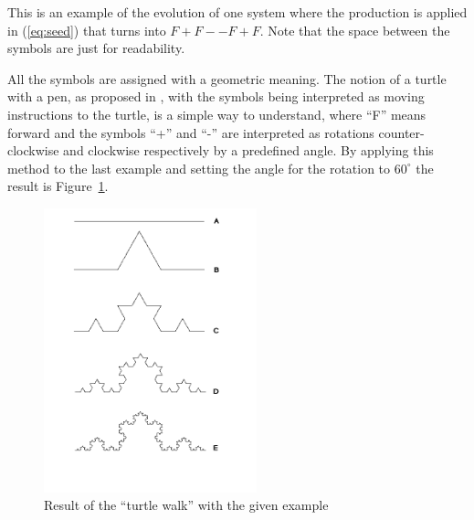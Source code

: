 
This is an example of the evolution of one system where the production is applied  in (\ref{eq:seed}) that turns into $F+F--F+F$. Note that the space
between the symbols are just for readability.

All the symbols are assigned with a geometric meaning. The notion of a turtle with a pen, as proposed in \cite{abelson1982aa}, with the symbols being
interpreted as moving instructions to the turtle, is a simple way to understand, where ``F'' means forward and the symbols ``+'' and ``-'' are interpreted as rotations counter-clockwise and clockwise respectively by a predefined angle. By applying this method to the last example and setting the angle for the rotation to $60^{\circ}$ the result is Figure~\ref{fig:kockLS}.

\begin{figure}[htbp]
   \centering
   \includegraphics[width=0.55\textwidth]{images/Theory/L_Systems/koch.png}
   \caption{Result of the ``turtle walk'' with the given example}
   \label{fig:kockLS}
\end{figure}









